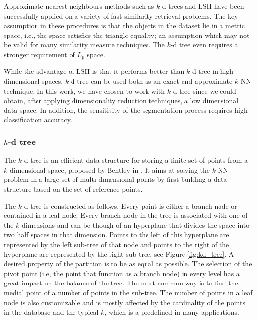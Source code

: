 \iftoggle{edit-mode}{\hspace{0pt}\marginpar{Examples of Exact and Approximate Indexing}}{}
Approximate nearest neighbours methods such as $k$-d trees and LSH have been successfully applied on a variety of fast similarity retrieval problems.
The key assumption in these procedures is that the objects in the dataset lie in a metric space, i.e., the space satisfies the triangle equality; an assumption which may not be valid for many similarity measure techniques.
The $k$-d tree even requires a stronger requirement of $L_p$ space. 

\iftoggle{edit-mode}{\hspace{0pt}\marginpar{This work}}{}
While the advantage of LSH is that it performs better than $k$-d tree in high dimensional spaces, $k$-d tree can be used both as an exact and approximate $k$-NN technique. 
In this work, we have chosen to work with $k$-d tree since we could obtain, after applying dimensionality reduction techniques, a low dimensional data space.
In addition, the sensitivity of the segmentation process requires high classification accuracy.

\subsubsection{$k$-d tree}

\iftoggle{edit-mode}{\hspace{0pt}\hspace{0pt}\marginpar{A short introduction to $k$-d tree}}{} 
The $k$-d tree is an efficient data structure for storing a finite set of points from a $k$-dimensional space, proposed by Bentley in \cite{bentley1975multidimensional}. 
It aims at solving the $k$-NN problem in a large set of multi-dimensional points by first building a data structure based on the set of reference points. 

\iftoggle{edit-mode}{\hspace{0pt}\marginpar{How it works, how the data is saved and extracted}}{} 
The $k$-d tree is constructed as follows. 
Every point is either a branch node or contained in a leaf node. 
Every branch node in the tree is associated with one of the $k$-dimensions and can be though of an hyperplane that divides the space into two half spaces in that dimension. 
Points to the left of this hyperplane are represented by the left sub-tree of that node and points to the right of the hyperplane are represented by the right sub-tree, see Figure \ref{fig:kd_tree}. 
A desired property of the partition is to be as equal as possible. 
The selection of the pivot point (i.e,  the point that function as a branch node) in every level has a great impact on the balance of the tree. 
The most common way is to find the medial point of a number of points in the sub-tree. 
The number of points in a leaf node is also customizable and is mostly affected by the cardinality of the points in the database and the typical $k$, which is a predefined in many applications.

